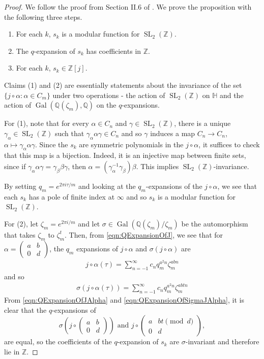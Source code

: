 \documentclass{amsart}
\theoremstyle{definition}
\theoremstyle{remark}
\numberwithin{equation}{section}
\newcommand{\bbH}{\mathbb H}
\newcommand{\bbQ}{\mathbb Q}
\newcommand{\bbZ}{\mathbb Z}
\newcommand{\inv}{^{-1}}
\newcommand{\twobytwo}[4]{\left(\begin{array}{cc} #1 & #2 \\ #3 & #4\end{array} \right)}
\DeclareMathOperator{\Gal}{Gal}
\DeclareMathOperator{\SL}{SL}
\begin{document}
\begin{proof}
We follow the proof from Section II.6 of \cite{SilvermanATAEC}. We prove the proposition with the following three steps.
\begin{enumerate}
\item For each $k$, $s_{k}$ is a modular function for $\SL_{2}(\bbZ)$.
\item The $q$-expansion of $s_{k}$ has coefficients in $\bbZ$.
\item For each $k$, $s_{k} \in \bbZ[j]$.
\end{enumerate}

 Claims (1) and (2) are essentially statements about the invariance of the set $\{j \circ \alpha: \alpha \in C_{m}\}$ under two operations - the action of $\SL_{2}(\bbZ)$ on $\bbH$ and the action of $\Gal(\bbQ(\zeta_{m}), \bbQ)$ on the $q$-expansions. 

For (1), note that for every $\alpha \in C_{n}$ and $\gamma \in \SL_{2}(\bbZ)$, there is a unique $\gamma_{\alpha} \in \SL_{2}(\bbZ)$ such that $\gamma_{\alpha} \alpha \gamma \in C_{n}$ and so $\gamma$ induces a map $C_{n} \to C_{n}$, $\alpha \mapsto \gamma_{\alpha} \alpha \gamma$. Since the $s_{k}$ are symmetric polynomials in the $j \circ \alpha$, it suffices to check that this map is a bijection. Indeed, it is an injective map between finite sets, since if $\gamma_{\alpha} \alpha \gamma = \gamma_{\beta} \beta \gamma$, then $\alpha = (\gamma_{\alpha}\inv \gamma_{\beta}) \beta$. This implies $\SL_{2}(\bbZ)$-invariance.

 By setting $q_{m} = e^{2\pi i \tau/m}$ and looking at the $q_{m}$-expansions of the $j \circ \alpha$, we see that each $s_{k}$ has a pole of finite index at $\infty$ and so $s_{k}$ is a modular function for $\SL_{2}(\bbZ)$. 

For (2), let $\zeta_{m} = e^{2\pi i/m}$ and let $\sigma \in \Gal(\bbQ(\zeta_{m})/\zeta_{m})$ be the automorphism that takes $\zeta_{m}$ to $\zeta_{m}^{t}$. Then, from \eqref{eqn:QExpansionOfJ}, we see that for $\alpha = \twobytwo{a}{b}{0}{d}$, the $q_{m}$ expansions of $j \circ \alpha$ and $\sigma(j \circ \alpha)$ are 
\begin{align} \label{eqn:QExpansionOfJAlpha}
 j\circ \alpha(\tau) = \sum_{n=-1}^{\infty} c_{n} q_{m}^{a^2 n} \zeta_{m}^{a b n} 
\end{align}
and so 
\begin{align} \label{eqn:QExpansionOfSigmaJAlpha}
\sigma(j\circ \alpha(\tau)) = \sum_{n=-1}^{\infty} c_{n} q_{m}^{a^2 n} \zeta_{m}^{a b t n} 
\end{align}
From \eqref{eqn:QExpansionOfJAlpha} and \eqref{eqn:QExpansionOfSigmaJAlpha}, it is clear that the $q$-expansions of 
\[
 \sigma\left(j \circ \twobytwo{a}{b}{0}{d}\right) \text{ and } j \circ \twobytwo{a}{bt \pmod{d}}{0}{d},
 \]
are equal, so the coefficients of the $q$-expansion of $s_{k}$ are $\sigma$-invariant and therefore lie in $\bbZ$.


\end{proof}
\end{document}
